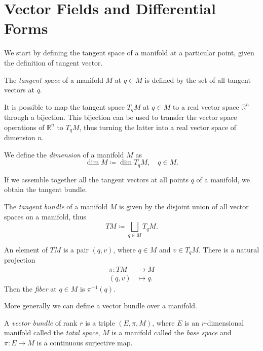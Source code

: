 \section{Vector Fields and Differential Forms}
\label{sec:sec1}

We start by defining the tangent space of a manifold at a particular point, given the definition of tangent vector.

\begin{definition}
    The \emph{tangent space} of a manifold $M$ at $q \in M$ is defined by the set of all tangent vectors at $q$.
\end{definition}

It is possible to map the tangent space $T_q M$ at $q \in M$ to a real vector space $\mathbb{R}^n$ through a bijection.
This bijection can be used to transfer the vector space operations of $\mathbb{R}^n$ to $T_q M$, thus turning the latter into a real vector space of dimension $n$.

\begin{definition}
    We define the \emph{dimension} of a manifold $M$ as
    \begin{equation*}
        \dim M \coloneqq \dim T_q M , \quad q \in M .
    \end{equation*}
\end{definition}

If we assemble together all the tangent vectors at all points $q$ of a manifold, we obtain the tangent bundle.

\begin{definition}
    The \emph{tangent bundle} of a manifold $M$ is given by the disjoint union of all vector spaces on a manifold, thus
    \begin{equation*}
        TM \coloneqq \bigsqcup _{q \in M} T_q M .
    \end{equation*}
\end{definition}

An element of $TM$ is a pair $(q, v)$, where $q \in M$ and $v \in T_q M$.
There is a natural projection
\begin{align*}
    \pi : TM &\rightarrow M \\
    (q, v) &\mapsto q .
\end{align*}
Then the \emph{fiber} at $q \in M$ is $\pi ^{-1} (q)$.

More generally we can define a vector bundle over a manifold.

\begin{definition}
    A \emph{vector bundle} of rank $r$ is a triple $(E, \pi, M)$, where $E$ is an $r$-dimensional manifold called the \emph{total space}, $M$ is a manifold called the \emph{base space} and $\pi : E \rightarrow M$ is a continuous surjective map.
\end{definition}

